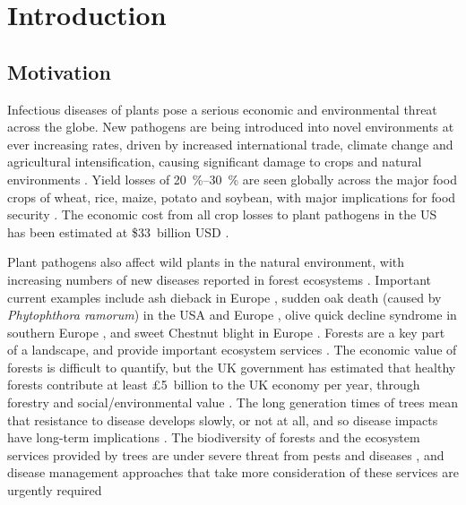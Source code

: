 %

\chapter{Introduction}\label{ch:intro}

\section{Motivation}

Infectious diseases of plants pose a serious economic and environmental threat across the globe. New pathogens are being introduced into novel environments at ever increasing rates, driven by increased international trade, climate change and agricultural intensification, causing significant damage to crops and natural environments \citep{anderson_emerging_2004, brasier_biosecurity_2008,}. Yield losses of \SIrange[range-units=single]{20}{30}{\percent} are seen globally across the major food crops of wheat, rice, maize, potato and soybean, with major implications for food security \citep{strange_plant_2005,oerke_crop_2006,savary_global_2019}. The economic cost from all crop losses to plant pathogens in the US has been estimated at \$33~billion USD \citep{pimentel_update_2005}.

Plant pathogens also affect wild plants in the natural environment, with increasing numbers of new diseases reported in forest ecosystems \citep{stenlid_emerging_2011}. Important current examples include ash dieback in Europe \citep[caused by \emph{Hymenoscyphus fraxineus};][]{kowalski_pathogenicity_2009, defra_tree_2014}, sudden oak death (caused by \emph{Phytophthora ramorum}) in the USA \citep{rizzo_sudden_2003} and Europe \citep{brasier_plant_2010}, olive quick decline syndrome in southern Europe \citep[caused by \emph{Xylella fastidiosa};][]{sicard_xylella_2018}, and sweet Chestnut blight in Europe \citep[caused by \emph{Cryphonectria parasitica};][]{milgroom_biological_2004}. Forests are a key part of a landscape, and provide important ecosystem services \citep{bateman_bringing_2013}. The economic value of forests is difficult to quantify, but the UK government has estimated that healthy forests contribute at least £5~billion to the UK economy per year, through forestry and social/environmental value \citep{green_future}. The long generation times of trees mean that resistance to disease develops slowly, or not at all, and so disease impacts have long-term implications \citep{boyd_consequence_2013}. The biodiversity of forests and the ecosystem services provided by trees are under severe threat from pests and diseases \citep{freer_tree_2017}, and disease management approaches that take more consideration of these services are urgently required \citep{boyd_consequence_2013}

